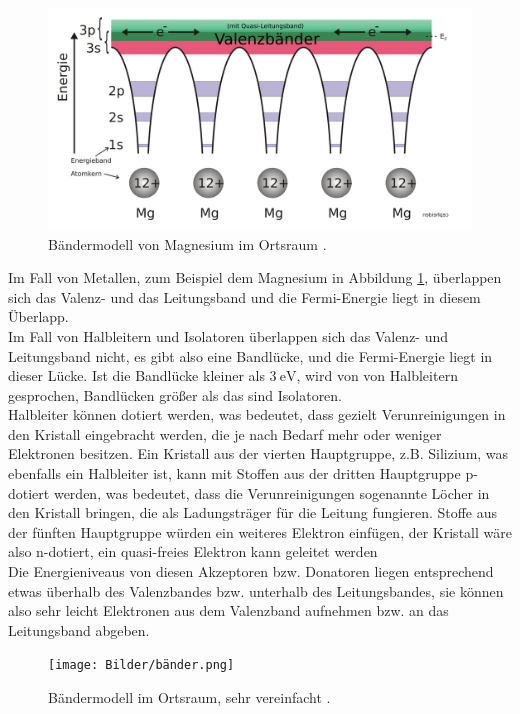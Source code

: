 \begin{figure}[H]
    \centering
    \includegraphics[width=\textwidth]{Bilder/Bändermodell-Potentialtöpfe-Mg.svg.png}
    \caption{Bändermodell von Magnesium im Ortsraum \cite{magnesium}.}
    \label{fig:magnesium}
\end{figure}
Im Fall von Metallen, zum Beispiel dem Magnesium in Abbildung \ref{fig:magnesium},
überlappen sich das Valenz- und das Leitungsband und die Fermi-Energie liegt in diesem Überlapp. \\
Im Fall von Halbleitern und Isolatoren überlappen sich das Valenz- und Leitungsband nicht, es gibt also eine Bandlücke, und die Fermi-Energie liegt in dieser Lücke. Ist die Bandlücke kleiner als $\qty{3}{\electronvolt}$, wird von von Halbleitern gesprochen,
Bandlücken größer als das sind Isolatoren. \\
Halbleiter können dotiert werden, was bedeutet, dass gezielt Verunreinigungen in den Kristall eingebracht werden, die je nach Bedarf mehr oder weniger Elektronen besitzen.
Ein Kristall aus der vierten Hauptgruppe, z.B. Silizium, was ebenfalls ein Halbleiter ist, kann mit Stoffen aus der dritten Hauptgruppe p-dotiert werden, was bedeutet, dass die Verunreinigungen sogenannte Löcher
in den Kristall bringen, die als Ladungsträger für die Leitung fungieren. Stoffe aus der fünften Hauptgruppe würden ein weiteres Elektron einfügen, der Kristall wäre also n-dotiert, ein quasi-freies Elektron kann geleitet werden\\
Die Energieniveaus von diesen Akzeptoren bzw. Donatoren liegen entsprechend etwas überhalb des Valenzbandes bzw. unterhalb des Leitungsbandes, sie können also sehr leicht Elektronen aus dem Valenzband aufnehmen bzw. an das Leitungsband abgeben.

\begin{figure}[H]
    \centering
    \texttt{[image: Bilder/bänder.png]}
    \caption{Bändermodell im Ortsraum, sehr vereinfacht \cite{magnesium}.}
    \label{fig:bänder}
\end{figure}

